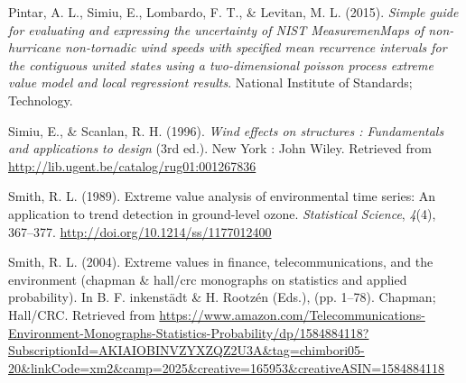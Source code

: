 \documentclass[12pt,oneside]{reedthesis}
\begin{document}
\leavevmode\hypertarget{ref-Pintar2015}{}%
Pintar, A. L., Simiu, E., Lombardo, F. T., \& Levitan, M. L. (2015). \emph{Simple guide for evaluating and expressing the uncertainty of NIST MeasuremenMaps of non-hurricane non-tornadic wind speeds with specified mean recurrence intervals for the contiguous united states using a two-dimensional poisson process extreme value model and local regressiont results}. National Institute of Standards; Technology.

\leavevmode\hypertarget{ref-Simiu1996}{}%
Simiu, E., \& Scanlan, R. H. (1996). \emph{Wind effects on structures : Fundamentals and applications to design} (3rd ed.). New York : John Wiley. Retrieved from \url{http://lib.ugent.be/catalog/rug01:001267836}

\leavevmode\hypertarget{ref-Smith1989}{}%
Smith, R. L. (1989). Extreme value analysis of environmental time series: An application to trend detection in ground-level ozone. \emph{Statistical Science}, \emph{4}(4), 367--377. \url{http://doi.org/10.1214/ss/1177012400}

\leavevmode\hypertarget{ref-Smith2004}{}%
Smith, R. L. (2004). Extreme values in finance, telecommunications, and the environment (chapman \& hall/crc monographs on statistics and applied probability). In B. F. inkenstädt \& H. Rootzén (Eds.), (pp. 1--78). Chapman; Hall/CRC. Retrieved from \url{https://www.amazon.com/Telecommunications-Environment-Monographs-Statistics-Probability/dp/1584884118?SubscriptionId=AKIAIOBINVZYXZQZ2U3A\&tag=chimbori05-20\&linkCode=xm2\&camp=2025\&creative=165953\&creativeASIN=1584884118}


\end{document}
